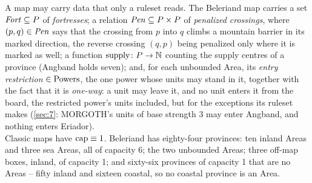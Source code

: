 \documentclass[12pt,a4paper]{article}
\begin{document}
A map may carry data that only a ruleset reads.
The Beleriand map carries a set $\mathit{Fort} \subseteq P$ of \emph{fortresses}; a relation $\mathit{Pen} \subseteq P \times P$ of \emph{penalized crossings}, where $(p, q) \in \mathit{Pen}$ says that the crossing from $p$ into $q$ climbs a mountain barrier in its marked direction, the reverse crossing $(q, p)$ being penalized only where it is marked as well; a function $\operatorname{supply}\colon P \to \mathbb{N}$ counting the supply centres of a province (Angband holds seven); and, for each unbounded Area, its \emph{entry restriction} $\in \mathrm{Powers}$, the one power whose units may stand in it, together with the fact that it is \emph{one-way}: a unit may leave it, and no unit enters it from the board, the restricted power's units included, but for the exceptions its ruleset makes (\cref{sec:7}: MORGOTH's units of base strength 3 may enter Angband, and nothing enters Eriador).\\
Classic maps have $\operatorname{cap} \equiv 1$.
Beleriand has eighty-four provinces: ten inland Areas and three sea Areas, all of capacity 6; the two unbounded Areas; three off-map boxes, inland, of capacity 1; and sixty-six provinces of capacity 1 that are no Areas -- fifty inland and sixteen coastal, so no coastal province is an Area.
\end{document}
